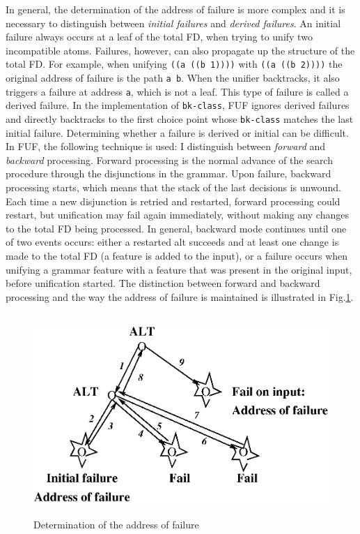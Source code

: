 \documentclass[10pt,a4paper]{report}
\begin{document}
In general, the determination of the address of failure is more complex and
it is necessary to distinguish between {\em initial failures} and {\em derived
failures}.  An initial failure always occurs at a leaf of the total FD,
when trying to unify two incompatible atoms.  Failures, however, can also
propagate up the structure of the total FD.  For example, when unifying
{\tt ((a ((b 1))))} with {\tt ((a ((b 2))))} the original address of failure is
the path {\tt {a b}}. When the unifier backtracks, it also triggers a failure
at address {\tt {a}}, which is not a leaf.  This type of failure is called a
derived failure.  In the implementation of {\tt bk-class}, FUF ignores
derived failures and directly backtracks to the first choice point whose
{\tt bk-class} matches the last initial failure.  Determining whether a
failure is derived or initial can be difficult.  In FUF, the following
technique is used: I distinguish between {\em forward} and {\em backward}
processing.  Forward processing is the normal advance of the search
procedure through the disjunctions in the grammar.  Upon failure, backward
processing starts, which means that the stack of the last decisions is
unwound.  Each time a new disjunction is retried and restarted, forward
processing could restart, but unification may fail again immediately,
without making any changes to the total FD being processed.  In general,
backward mode continues until one of two events occurs: either a restarted
alt succeeds and at least one change is made to the total FD (a feature is
added to the input), or a failure occurs when unifying a grammar feature
with a feature that was present in the original input, before unification
started.  The distinction between forward and backward processing and the
way the address of failure is maintained is illustrated in Fig.\ref{fig4:bkclass1}.

\begin{figure}[p]
    \centering
    \includegraphics[width=5in, height=3in]{bkclass1.eps}
    \caption{Determination of the address of failure}
    \label{fig4:bkclass1}
\end{figure}
\end{document}
